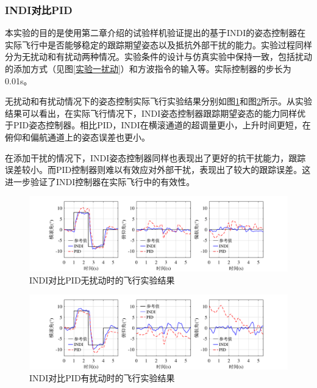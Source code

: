 \subsubsection{INDI对比PID}

本实验的目的是使用第二章介绍的试验样机验证提出的基于INDI的姿态控制器在实际飞行中是否能够稳定的跟踪期望姿态以及抵抗外部干扰的能力。实验过程同样分为无扰动和有扰动两种情况。实验条件的设计与仿真实验中保持一致，包括扰动的添加方式（见图\ref{实验一扰动}）和方波指令的输入等。实际控制器的步长为0.01s。

无扰动和有扰动情况下的姿态控制实际飞行实验结果分别如图\ref{INDI对比PID无扰动飞行实验结果}和图\ref{INDI对比PID有扰动飞行实验结果}所示。从实验结果可以看出，在实际飞行情况下，INDI姿态控制器跟踪期望姿态的能力同样优于PID姿态控制器。相比PID，INDI在横滚通道的超调量更小，上升时间更短，在俯仰和偏航通道上的姿态误差也更小。

在添加干扰的情况下，INDI姿态控制器同样也表现出了更好的抗干扰能力，跟踪误差较小。而PID控制器则难以有效应对外部干扰，表现出了较大的跟踪误差。这进一步验证了INDI控制器在实际飞行中的有效性。
\begin{figure}[htbp]
	\centering
	\begin{minipage}[c]{1\textwidth}
        \centering
        \includegraphics[scale=1]{Fig/INDI对比PID无扰动飞行实验结果.pdf}
        \caption{\label{INDI对比PID无扰动飞行实验结果}INDI对比PID无扰动时的飞行实验结果}
        \end{minipage}
\end{figure}
\begin{figure}[htbp]
	\centering
	\begin{minipage}[c]{1\textwidth}
        \centering
        \includegraphics[scale=1]{Fig/INDI对比PID有扰动飞行实验结果.pdf}
        \caption{\label{INDI对比PID有扰动飞行实验结果}INDI对比PID有扰动时的飞行实验结果}
        \end{minipage}
\end{figure}





